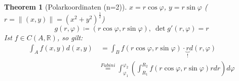 \documentclass[12pt]{extreport} %
\newcommand{\R}{\mathbb{R}}
\theoremstyle{named}
\newtheorem{unnamedtheorem}{Theorem} \counterwithin{unnamedtheorem}{chapter}
\theoremstyle{nnamed}
\theoremstyle{itshape}
\theoremstyle{normal}
\begin{document}
\begin{unnamedtheorem}[Polarkoordinaten (n=2)] \label{20.8:satz} $x = r \cos \varphi$, $y = r \sin \varphi$ ($r = \|(x,y)\| = \left(x^{2} + y^{2} \right)^{\frac{1}{2}}$) %
	$$ g(r, \varphi) \coloneqq (r \cos \varphi, r \sin \varphi), ~ \det g'(r, \varphi) = r $$
	Ist $f \in C(A, \R)$, so gilt:
	\begin{align*}
		\int_{A} f(x,y) d(x,y) & ~= \int_{B} f(r\cos \varphi, r \sin \varphi) \cdot \underbrace{r}_{!} d(r, \varphi) \\
	& \overset{Fubini}{=} \int_{\varphi_{1}}^{\varphi_{2}} \left( \int_{R_{1}}^{R_{2}} f(r \cos \varphi, r \sin \varphi) r dr \right) d\varphi 
	\end{align*} 
\end{unnamedtheorem}
\end{document}
